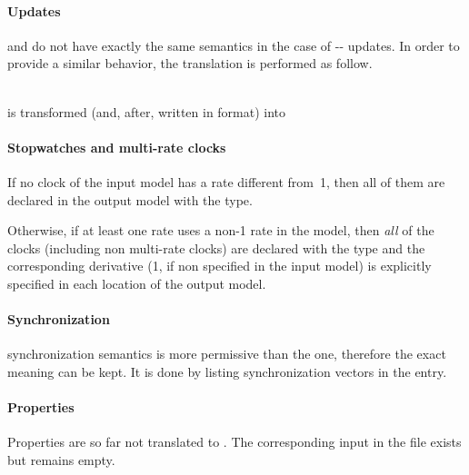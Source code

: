 \paragraph{Updates}
\imitator{} and \jani{} do not have exactly the same semantics in the case of -- updates.
In order to provide a similar behavior, the translation is performed as follow.

\\ is transformed (and, after, written in \jani{} format) into


\paragraph{Stopwatches and multi-rate clocks}
If no clock of the input model has a rate different from~1, then all of them are declared in the output \jani{} model with the  type.

Otherwise, if at least one rate uses a non-1 rate in the \imitator{} model, then \emph{all} of the clocks (including non multi-rate clocks) are declared with the  type and the corresponding derivative (1, if non specified in the \imitator{} input model) is explicitly specified in each location of the output model.

\paragraph{Synchronization}
\jani{} synchronization semantics is more permissive than the \imitator{} one, therefore the exact meaning can be kept.
It is done by listing synchronization vectors in the  entry.

\paragraph{Properties}
Properties are so far not translated to \jani{}.
The corresponding input in the \jani{} file exists but remains empty.



